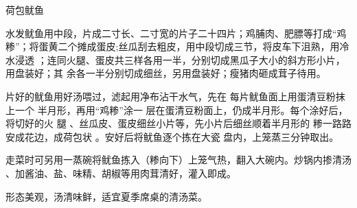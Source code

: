 \begin{recipe}{荷包鱿鱼}

\ingredients



\preparation

\step 水发鱿鱼用中段，片成二寸长、二寸宽的片子二十四片；鸡脯肉、肥膘等打成“鸡
糁”；将蛋黄二个摊成蛋皮;丝瓜刮去粗皮，用中段切成三节，将皮车下沮熟，用冷水浸透
；连同火腿、蛋皮共三样各用一半，分别切成黑瓜子大小的斜方形小片，用盘装好；其
余各一半分别切成细丝，另用盘装好；瘦猪肉砸成茸子待用。

片好的鱿鱼用好汤喂过，滤起用净布沾干水气，先在 每片鱿鱼面上用蛋清豆粉抹上一个
半月形，再用“鸡糁”涂一 层在蛋清豆粉面上，仍成半月形。每个涂好后，将切好的火 腿
、丝瓜皮、蛋皮细丝小片等，先小片后细丝顺着半月形的 糁一路路安成花边，成荷包状
。安好后将鱿鱼逐个拣在大瓷 盘内，上笼蒸三分钟取出。

\step 走菜时可另用一蒸碗将鱿鱼拣入（糁向下）上笼气热，翻入大碗内。炒锅内掺清汤
、加酱油、盐、味精、胡椒等用肉茸清好，灌入即成。

\features

形态美观，汤清味鲜，适宜夏季席桌的清汤菜。

\end{recipe}

